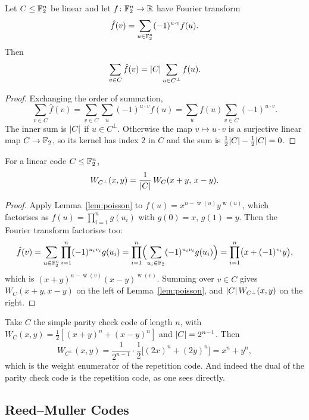 \documentclass[a4paper]{scrartcl}
\DeclareMathOperator{\wt}{w}
\begin{document}
\begin{lemma}\label{lem:poisson}
	Let $C \le \mathbb{F}_2^n$ be linear and let $f\colon \mathbb{F}_2^n \to \mathbb{R}$ have Fourier transform
	$$\hat f(v) = \sum_{u \in \mathbb{F}_2^n}(-1)^{u\cdot v}f(u).$$
	Then
	$$\sum_{v \in C}\hat f(v) = \lvert C\rvert\sum_{u \in C^\perp}f(u).$$
\end{lemma}

\begin{proof}
	Exchanging the order of summation,
	$$\sum_{v\in C}\hat f(v) = \sum_{v\in C}\sum_{u}(-1)^{u\cdot v}f(u) = \sum_u f(u)\sum_{v\in C}(-1)^{u\cdot v}.$$
	The inner sum is $\lvert C\rvert$ if $u \in C^\perp$. Otherwise the map $v \mapsto u\cdot v$ is a surjective linear map $C \to \mathbb{F}_2$, so its kernel has index $2$ in $C$ and the sum is $\tfrac12\lvert C\rvert - \tfrac12\lvert C\rvert = 0$.
\end{proof}

\begin{theorem}
	For a linear code $C \le \mathbb{F}_2^n$,
	$$W_{C^\perp}(x,y) = \frac{1}{\lvert C\rvert}\,W_C(x+y,\,x-y).$$
\end{theorem}

\begin{proof}
	Apply Lemma~\ref{lem:poisson} to $f(u) = x^{n-\wt(u)}y^{\wt(u)}$, which factorises as $f(u) = \prod_{i=1}^n g(u_i)$ with $g(0)=x$, $g(1)=y$. Then the Fourier transform factorises too:
	$$\hat f(v) = \sum_{u\in\mathbb{F}_2^n}\prod_{i=1}^n(-1)^{u_iv_i}g(u_i) = \prod_{i=1}^n\Bigl(\sum_{u_i \in \mathbb{F}_2}(-1)^{u_iv_i}g(u_i)\Bigr) = \prod_{i=1}^n\bigl(x+(-1)^{v_i}y\bigr),$$
	which is $(x+y)^{n-\wt(v)}(x-y)^{\wt(v)}$. Summing over $v \in C$ gives $W_C(x+y,x-y)$ on the left of Lemma~\ref{lem:poisson}, and $\lvert C\rvert\,W_{C^\perp}(x,y)$ on the right.
\end{proof}

\begin{example}
	Take $C$ the simple parity check code of length $n$, with $W_C(x,y) = \tfrac12[(x+y)^n+(x-y)^n]$ and $\lvert C\rvert=2^{n-1}$. Then
	$$W_{C^\perp}(x,y) = \frac{1}{2^{n-1}}\cdot\frac12\bigl[(2x)^n + (2y)^n\bigr] = x^n+y^n,$$
	which is the weight enumerator of the repetition code. And indeed the dual of the parity check code is the repetition code, as one sees directly.
\end{example}

\subsection{Reed--Muller Codes}
\end{document}
